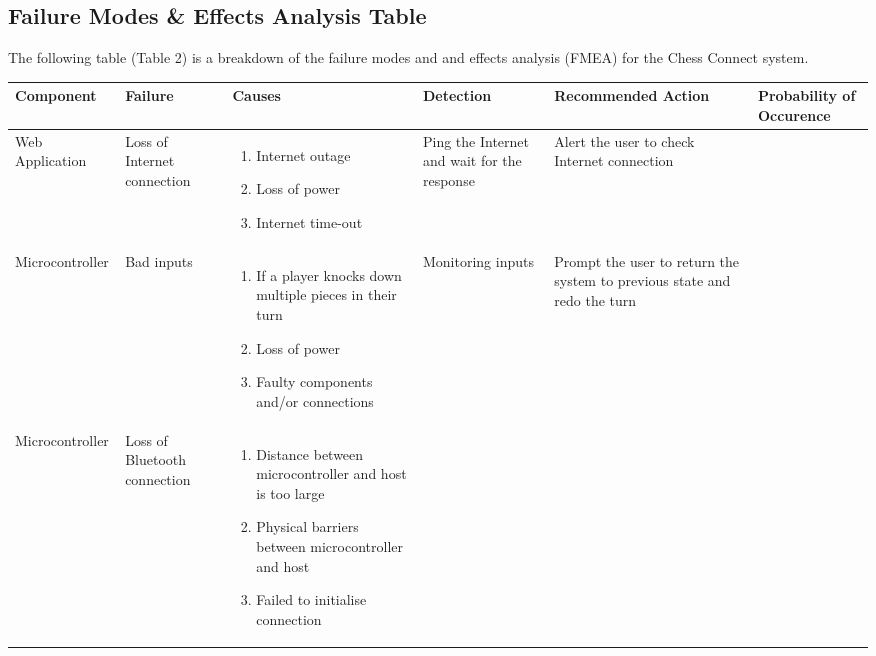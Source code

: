 \documentclass{article}
\begin{document}
\subsection{Failure Modes \& Effects Analysis Table}
{The following table (Table 2) is a breakdown of the failure modes and and effects 
analysis (FMEA) for the Chess Connect system.}
\begin{table}[!htbp]
    \centering
        \setlength{\leftmargini}{0.4cm}
        \begin{tabular}{| >{\centering\arraybackslash}m{2.5cm} | 
          >{\centering\arraybackslash}m{2cm} | 
          >{\centering\arraybackslash}m{4cm} |
          >{\centering\arraybackslash}m{2cm} |
          >{\centering\arraybackslash}m{3cm} |
          >{\centering\arraybackslash}m{1.5cm}|}
        \hline
        \rowcolor[gray]{0.9}
        Component & Failure & Causes & Detection & Recommended Action & Probability of Occurence \\
        \hline
        Web Application & Loss of Internet connection
        & \begin{enumerate}[label=(\alph*)]
            \item Internet outage 
            \item Loss of power
            \item Internet time-out 
        \end{enumerate} & Ping the Internet and wait for the response & Alert the user to check Internet connection & 0.3 \\
        \hline
        Microcontroller & Bad inputs &
        \begin{enumerate}[label=(\alph*)]
            \item If a player knocks down multiple pieces in their turn 
            \item Loss of power
            \item Faulty components and/or connections 
        \end{enumerate} & Monitoring inputs & Prompt the user to return the system to previous state and redo the turn & 0.4 \\ 
        \hline
        Microcontroller & Loss of Bluetooth connection & \begin{enumerate}[label=(\alph*)]
            \item Distance between microcontroller and host is too large
            \item Physical barriers between microcontroller and host
            \item Failed to initialise connection

\end{enumerate}
\end{tabular}
\end{table}
\end{document}
